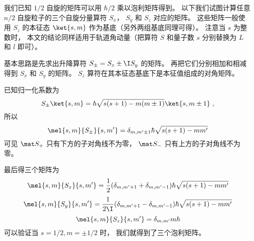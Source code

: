 

我们已知 $1/2$ 自旋的矩阵可以用 $\hbar/2$ 乘以泡利矩阵得到。 以下我们试图计算任意 $n/2$ 自旋粒子的三个自旋分量算符 $S_x$， $S_y$ 和 $S_z$ 对应的矩阵。 这些矩阵一般使用 $S_z$ 的本征态 $\ket{s, m}$ 作为基底（另外两组基底同理可得）。 注意当 $s$ 为整数时， 本文的结论同样适用于轨道角动量（把算符 $S$ 和量子数 $s$ 分别替换为 $L$ 和 $l$ 即可）。

基本思路是先求出升降算符 $S_\pm = S_x \pm \I S_y$ 的矩阵。 再把它们分别相加和相减得到 $S_x$ 和 $S_y$ 的矩阵。 $S_z$ 算符在其本征态基底下是本征值组成的对角矩阵。

已知归一化系数为
\begin{equation}
S_\pm \ket{s,m} = \hbar \sqrt{s(s + 1) - m(m \pm 1)} \ket{s,m\pm1}~,
\end{equation}
所以
\begin{equation}
\mel{s,m}{S_\pm}{s,m'} = \delta_{m, m'\pm1} \hbar \sqrt{s(s + 1) - mm'}
\end{equation}
可见 $\mat S_+$ 只有下方的子对角线不为零， $\mat S_-$ 只有上方的子对角线不为零。

最后得三个矩阵为
\begin{equation}
\mel{s,m}{S_x}{s,m'} = \frac12(\delta_{m, m'+1} + \delta_{m, m'-1})\hbar \sqrt{s(s + 1) - mm'} 
\end{equation}
\begin{equation}
\mel{s,m}{S_y}{s,m'} = \frac{1}{2\I}(\delta_{m, m'+1} - \delta_{m, m'-1}) \hbar \sqrt{s(s + 1) - mm'}
\end{equation}
\begin{equation}
\mel{s,m}{S_z}{s,m'} = \delta_{m,m'} m\hbar 
\end{equation}
可以验证当 $s = 1/2, m = \pm1/2$ 时， 我们就得到了三个泡利矩阵。
